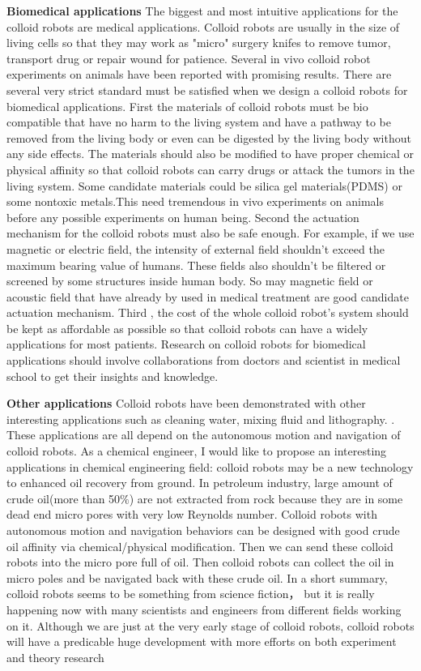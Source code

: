 \textbf{Biomedical applications} The biggest and most intuitive applications for the colloid robots are medical applications. Colloid robots are usually in the size of living cells so that they may work as "micro" surgery knifes to remove tumor, transport drug or repair wound for patience. Several in vivo colloid robot experiments  on animals have been reported \cite{Gao2015,li2018development} with promising results. There are several very strict standard must be satisfied when we design a colloid robots for biomedical applications. First the materials of colloid robots must be bio compatible that have no harm to the living system and have a pathway to be removed from the living body or even can be digested by the living body without any side effects.
The materials should also be modified to have proper chemical or physical affinity so that colloid robots can carry drugs or attack the tumors in the living system. Some candidate materials could be silica gel materials(PDMS) or some nontoxic metals.This need tremendous in vivo experiments on animals before  any possible experiments on human being. Second the actuation mechanism for the colloid robots must also be safe enough. For example, if we use magnetic or electric field, the intensity of external field shouldn't exceed the maximum bearing value of humans. These fields also shouldn't be  filtered or screened by some structures inside human body. So may magnetic field or acoustic field that have already by used in medical treatment are good  candidate actuation mechanism.  Third , the cost of the whole colloid robot's system should be kept as affordable as possible so that colloid robots can have a widely applications for most patients. Research on colloid robots for biomedical applications should involve collaborations from doctors and scientist in medical school to get their insights and knowledge.

\textbf{Other applications} Colloid robots have been demonstrated with other interesting applications such as cleaning water, mixing fluid and lithography. \cite{soler2014catalytic,fei2019magneto,li2014nanomotor}. These applications are all depend on the autonomous motion and navigation of colloid robots. As a chemical engineer, I would like to propose an interesting applications in chemical engineering field: colloid robots may be a new technology to enhanced oil recovery from ground. In petroleum industry, large amount of crude oil(more than 50$\%$) are not extracted from rock because they are in some dead end micro pores with very low Reynolds number. Colloid robots with autonomous motion and navigation behaviors can be designed with good crude oil affinity via chemical/physical modification. Then we can send these colloid robots into the micro pore full of oil.  Then colloid robots  can collect the oil in micro poles and be navigated back with these crude oil. In a short summary, colloid robots seems to be something from science fiction， but it is really happening now with many scientists and engineers from different fields working on it. Although we are just at the very early stage of colloid robots, colloid robots will have a predicable huge development with more efforts on both experiment and theory research
